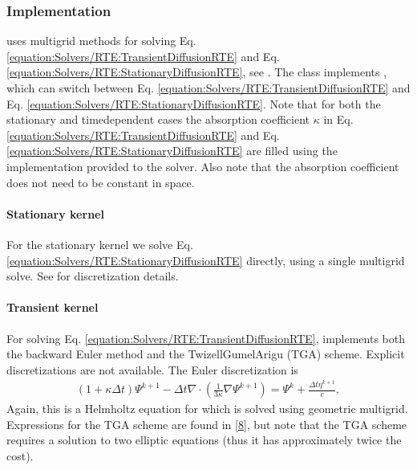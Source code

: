 \documentclass[letterpaper,10pt,english]{sphinxmanual}
\begin{document}
\subsubsection{Implementation}
\label{\detokenize{Solvers/RTE:implementation}}
 uses multigrid methods for solving Eq. \ref{equation:Solvers/RTE:TransientDiffusionRTE} and Eq. \ref{equation:Solvers/RTE:StationaryDiffusionRTE}, see {\hyperref[\detokenize{Source/LinearSolvers:chap-linearsolvers}]{}}.
The class implements , which can switch between Eq. \ref{equation:Solvers/RTE:TransientDiffusionRTE} and Eq. \ref{equation:Solvers/RTE:StationaryDiffusionRTE}.
Note that for both the stationary and time\sphinxhyphen{}dependent cases the absorption coefficient \(\kappa\) in Eq. \ref{equation:Solvers/RTE:TransientDiffusionRTE} and Eq. \ref{equation:Solvers/RTE:StationaryDiffusionRTE} are filled using the  implementation provided to the solver.
Also note that the absorption coefficient does not need to be constant in space.


\paragraph{Stationary kernel}
\label{\detokenize{Solvers/RTE:stationary-kernel}}
For the stationary kernel we solve Eq. \ref{equation:Solvers/RTE:StationaryDiffusionRTE} directly, using a single multigrid solve.
See {\hyperref[\detokenize{Source/LinearSolvers:chap-linearsolvers}]{}} for discretization details.


\paragraph{Transient kernel}
\label{\detokenize{Solvers/RTE:transient-kernel}}
For solving Eq. \ref{equation:Solvers/RTE:TransientDiffusionRTE},  implements both the backward Euler method and the Twizell\sphinxhyphen{}Gumel\sphinxhyphen{}Arigu (TGA) scheme.
Explicit discretizations are not available.
The Euler discretization is
\begin{equation*}
\begin{split}\left(1+ \kappa \Delta t\right)\Psi^{k+1} - \Delta t \nabla\cdot\left(\frac{1}{3\kappa}\nabla\Psi^{k+1}\right) = \Psi^{k} + \frac{\Delta t\eta^{k+1}}{c},\end{split}
\end{equation*}
Again, this is a Helmholtz equation for  which is solved using geometric multigrid.
Expressions for the TGA scheme are found in {[}\hyperlink{cite.ZZReferences:id34}{8}{]}, but note that the TGA scheme requires a solution to two elliptic equations (thus it has approximately twice the cost).
\end{document}
